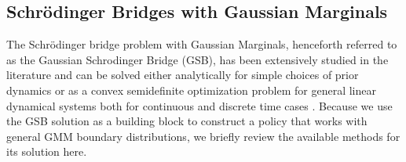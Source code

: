 \documentclass[twoside]{article}
\begin{document}
\subsection{Schr\"{o}dinger Bridges with Gaussian Marginals}
%
The Schr\"{o}dinger bridge problem with Gaussian Marginals, henceforth referred to as the Gaussian Schrodinger Bridge (GSB), has been extensively studied in the literature and can be solved either analytically for simple choices of prior dynamics \citep{bunne2023Schrodinger} or as a convex 
semidefinite optimization problem 
for general linear dynamical systems both for continuous and discrete time cases \citep{chen2015optimal2, liu2022optimal}.
Because we use the GSB solution as a building block to construct a policy that works with general GMM boundary distributions, we briefly review the available methods for its solution here.
\end{document}
